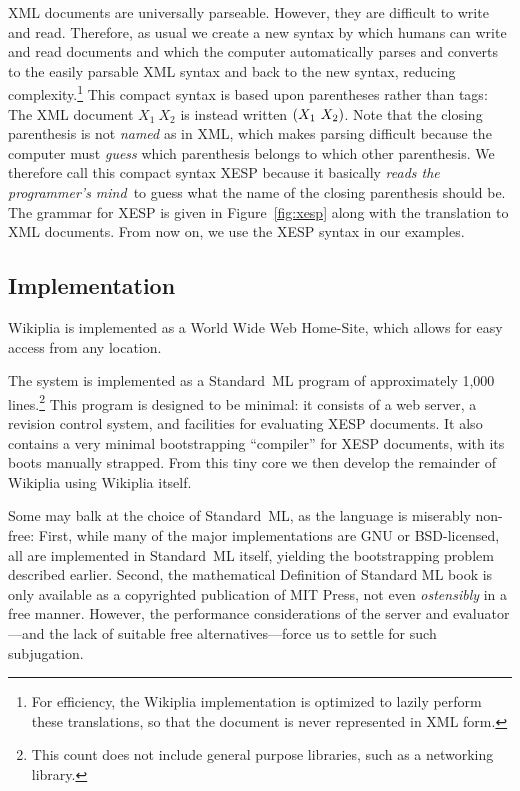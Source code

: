 \documentclass[twocolumn]{article}
\begin{document}
XML documents are universally parseable.\z{} However,
they are difficult to write and read. Therefore, as usual we create a new syntax by which humans can write and read
documents and which the computer automatically parses and converts to
the easily parsable XML syntax and back to the new syntax, reducing
complexity.\z\footnote{For efficiency, the Wikiplia implementation is
optimized to lazily perform these translations, so that the document
is never represented in XML form.} This compact syntax is based upon
parentheses rather than tags: The XML document $\tag{list}{X_1\ X_2}$
is instead written ${\tt(}X_1\ X_2{\tt)}$. Note that the closing
parenthesis is not {\em named} as in XML, which makes parsing
difficult because the computer must {\em guess} which parenthesis
belongs to which other parenthesis. We therefore call this compact
syntax XESP because it basically {\em reads the programmer's
mind}\, to guess what the name of the
closing parenthesis should be. The grammar for XESP is given in
Figure~\ref{fig:xesp} along with the translation to XML documents.
From now on, we use the XESP syntax in our examples.

\subsection{Implementation}

Wikiplia is implemented as a World Wide Web Home-Site, which allows
for easy access from any location.

The system is implemented as a Standard~ML program
of approximately 1,000 lines.\z\footnote{This count does not include
general purpose libraries, such as a networking library.} This program
is designed to be minimal: it consists of a web server, a revision
control system, and facilities for evaluating XESP documents. It also
contains a very minimal bootstrapping ``compiler'' for XESP documents,
with its boots manually strapped. From this tiny core we then develop
the remainder of Wikiplia using Wikiplia itself.

Some may balk at the choice of Standard~ML, as the language is
miserably non-free: First, while many of the major implementations are
GNU or BSD-licensed,\z{} all are implemented in
Standard~ML itself, yielding the bootstrapping problem described
earlier. Second, the mathematical Definition of Standard ML book is
only available as a copyrighted publication of MIT
Press,\z{} not even {\em ostensibly} in a free
manner. However, the performance considerations of the server and
evaluator---and the lack of suitable free alternatives---force us to
settle for such subjugation.
\end{document}
